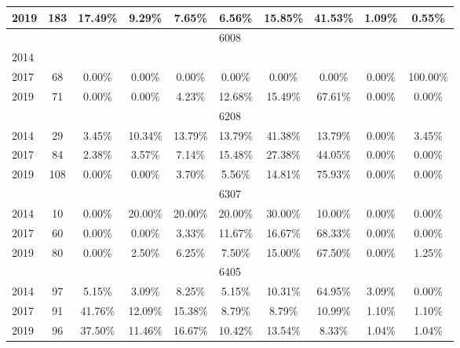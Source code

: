 \begin{table}[H]
\begin{tabular}{|l|c|ccc|ccc|cc|}
2019 & 183 & 17.49\% & 9.29\% & 7.65\% & 6.56\% & 15.85\% & 41.53\% & 1.09\% & 0.55\%\\
\hline
\hline
\multicolumn{10}{|c|}{6008}\\
\hline
2014 & & & & & & & & & \\
2017 & 68 & 0.00\% & 0.00\% & 0.00\% & 0.00\% & 0.00\% & 0.00\% & 0.00\% & 100.00\%\\
2019 & 71 & 0.00\% & 0.00\% & 4.23\% & 12.68\% & 15.49\% & 67.61\% & 0.00\% & 0.00\%\\
\hline
\hline
\multicolumn{10}{|c|}{6208}\\
\hline
2014 & 29 & 3.45\% & 10.34\% & 13.79\% & 13.79\% & 41.38\% & 13.79\% & 0.00\% & 3.45\%\\
2017 & 84 & 2.38\% & 3.57\% & 7.14\% & 15.48\% & 27.38\% & 44.05\% & 0.00\% & 0.00\%\\
2019 & 108 & 0.00\% & 0.00\% & 3.70\% & 5.56\% & 14.81\% & 75.93\% & 0.00\% & 0.00\%\\
\hline
\hline
\multicolumn{10}{|c|}{6307}\\
\hline
2014 & 10 & 0.00\% & 20.00\% & 20.00\% & 20.00\% & 30.00\% & 10.00\% & 0.00\% & 0.00\%\\
2017 & 60 & 0.00\% & 0.00\% & 3.33\% & 11.67\% & 16.67\% & 68.33\% & 0.00\% & 0.00\%\\
2019 & 80 & 0.00\% & 2.50\% & 6.25\% & 7.50\% & 15.00\% & 67.50\% & 0.00\% & 1.25\%\\
\hline
\hline
\multicolumn{10}{|c|}{6405}\\
\hline
2014 & 97 & 5.15\% & 3.09\% & 8.25\% & 5.15\% & 10.31\% & 64.95\% & 3.09\% & 0.00\%\\
2017 & 91 & 41.76\% & 12.09\% & 15.38\% & 8.79\% & 8.79\% & 10.99\% & 1.10\% & 1.10\%\\
2019 & 96 & 37.50\% & 11.46\% & 16.67\% & 10.42\% & 13.54\% & 8.33\% & 1.04\% & 1.04\%\\
\hline
\bottomrule
\end{tabular}
\end{table}
